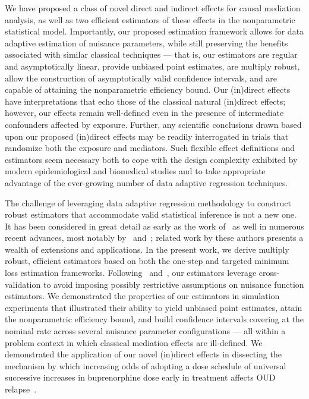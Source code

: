 We have proposed a class of novel direct and indirect effects for causal
mediation analysis, as well as two efficient estimators of these effects in the
nonparametric statistical model. Importantly, our proposed estimation framework
allows for data adaptive estimation of nuisance parameters, while still
preserving the benefits associated with similar classical techniques --- that
is, our estimators are regular and asymptotically linear, provide unbiased point
estimates, are multiply robust, allow the construction of asymptotically valid
confidence intervals, and are capable of attaining the nonparametric efficiency
bound. Our (in)direct effects have interpretations that echo those of the
classical natural (in)direct effects; however, our effects remain well-defined
even in the presence of intermediate confounders affected by exposure. Further,
any scientific conclusions drawn based upon our proposed (in)direct effects may
be readily interrogated in trials that randomize both the exposure and
mediators. Such flexible effect definitions and estimators seem necessary both
to cope with the design complexity exhibited by modern epidemiological and
biomedical studies and to take appropriate advantage of the ever-growing number
of data adaptive regression techniques.

The challenge of leveraging data adaptive regression methodology to construct
robust estimators that accommodate valid statistical inference is not a new one.
It has been considered in great detail as early as the work
of~\citet{pfanzagl1985contributions} as well in numerous recent advances, most
notably by~\citet{vdl2011targeted, vdl2018targeted}
and~\citet{chernozhukov2018double}; related work by these authors presents
a wealth of extensions and applications. In the present work, we derive multiply
robust, efficient estimators based on both the one-step and targeted minimum
loss estimation frameworks. Following~\citet{klaassen1987consistent}
and~\citet{zheng2011cross}, our estimators leverage cross-validation to avoid
imposing possibly restrictive assumptions on nuisance function estimators. We
demonstrated the properties of our estimators in simulation experiments that
illustrated their ability to yield unbiased point estimates, attain the
nonparametric efficiency bound, and build confidence intervals covering at the
nominal rate across several nuisance parameter configurations --- all within a
problem context in which classical mediation effects are ill-defined. We
demonstrated the application of our novel (in)direct effects in dissecting the
mechanism by which increasing odds of adopting a dose schedule of universal
successive increases in buprenorphine dose early in treatment affects OUD
relapse~\citep{lee2018comparative, rudolph2020explaining}.

